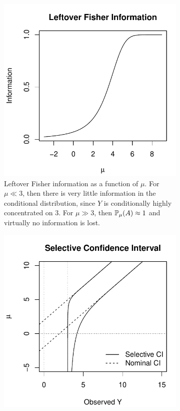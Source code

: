 \documentclass{article}
\theoremstyle{definition}
\begin{document}
\captionsetup[subfigure]{width=1.2\textwidth}
\begin{figure}
  \centering
  \begin{subfigure}[t]{0.4\textwidth}
    \includegraphics[width=\textwidth]{figs/informationUnivar.pdf}
    \caption{Leftover Fisher information as a function of $\mu$. For $\mu\ll 3$, then there is very little information in the conditional distribution, since $Y$ is conditionally highly concentrated on 3. For $\mu \gg 3$, then $\P_\mu(A) \approx 1$ and virtually no information is lost.}
    \label{fig:infoUnivar}
  \end{subfigure}
  \hspace{.1\textwidth}
  \begin{subfigure}[t]{0.4\textwidth}
    \includegraphics[width=\textwidth]{figs/umpuUnivar.pdf}

\end{subfigure}
\end{figure}
\end{document}
